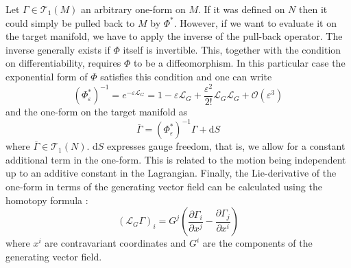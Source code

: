 \documentclass[a4paper,10pt]{article}
\begin{document}
Let $\Gamma \in \mathcal{T}_1(M)$ an arbitrary one-form on $M$. If it was defined on $N$ then it could simply be pulled back to $M$ by $\Phi^*$. However, if we want to evaluate it on the target manifold, we have to apply the inverse of the pull-back operator. The inverse generally exists if $\Phi$ itself is invertible. This, together with the condition on differentiability, requires $\Phi$ to be a diffeomorphism. In this particular case the exponential form of $\Phi$ satisfies this condition and one can write
\begin{equation}
	\left(\Phi^{*}_{\varepsilon}\right)^{-1} = e^{- \varepsilon \mathcal{L}_G} = 1 - \varepsilon \mathcal{L}_G + \frac{\varepsilon^2}{2!} \mathcal{L}_G \mathcal{L}_G + \mathcal{O}(\varepsilon^3)
	\label{eq:pullback_taylor_inv}
\end{equation}
and the one-form on the target manifold as
\begin{equation}
	\bar{\Gamma} = (\Phi_{\varepsilon}^*)^{-1} \Gamma + \mathrm{d}S
	\label{eq:gyro_lagrangian_general}
\end{equation}
where $\bar{\Gamma} \in \mathcal{T}_1(N)$. $\mathrm{d}S$ expresses gauge freedom, that is, we allow for a constant additional term in the one-form. This is related to  the motion being independent up to an additive constant in the Lagrangian. Finally, the Lie-derivative of the one-form in terms of the generating vector field can be calculated using the homotopy formula \cite{littlejohn}:
\begin{equation}
	(\mathcal{L}_G \Gamma)_i = G^j \left( \frac{\partial \Gamma_i}{\partial x^j} - \frac{\partial \Gamma_j}{\partial x^i} \right)
	\label{eq:homotopy}
\end{equation}
where $x^i$ are contravariant coordinates and $G^i$ are the components of the generating vector field. 

\end{document}
